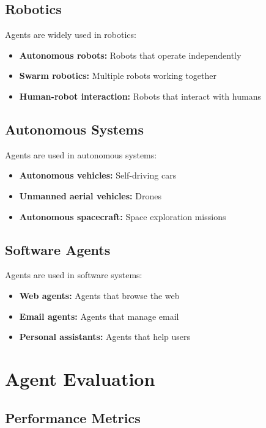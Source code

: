 \subsection{Robotics}

Agents are widely used in robotics:
\begin{itemize}
    \item \textbf{Autonomous robots:} Robots that operate independently
    \item \textbf{Swarm robotics:} Multiple robots working together
    \item \textbf{Human-robot interaction:} Robots that interact with humans
\end{itemize}

\subsection{Autonomous Systems}

Agents are used in autonomous systems:
\begin{itemize}
    \item \textbf{Autonomous vehicles:} Self-driving cars
    \item \textbf{Unmanned aerial vehicles:} Drones
    \item \textbf{Autonomous spacecraft:} Space exploration missions
\end{itemize}

\subsection{Software Agents}

Agents are used in software systems:
\begin{itemize}
    \item \textbf{Web agents:} Agents that browse the web
    \item \textbf{Email agents:} Agents that manage email
    \item \textbf{Personal assistants:} Agents that help users
\end{itemize}

\section{Agent Evaluation}

\subsection{Performance Metrics}

